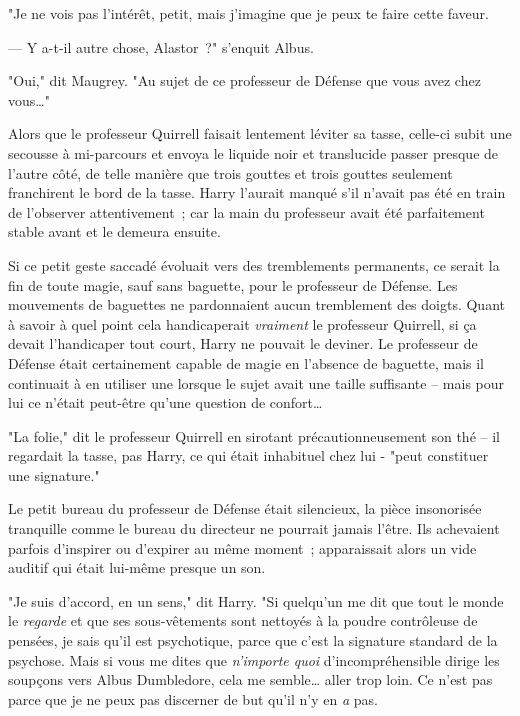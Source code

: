 "Je ne vois pas l'intérêt, petit, mais j'imagine que je peux te faire cette faveur.

--- Y a-t-il autre chose, Alastor~?" s'enquit Albus.

"Oui," dit Maugrey. "Au sujet de ce professeur de Défense que vous avez chez vous…"



Alors que le professeur Quirrell faisait lentement léviter sa tasse, celle-ci subit une secousse à mi-parcours et envoya le liquide noir et translucide passer presque de l'autre côté, de telle manière que trois gouttes et trois gouttes seulement franchirent le bord de la tasse. Harry l'aurait manqué s'il n'avait pas été en train de l'observer attentivement~; car la main du professeur avait été parfaitement stable avant et le demeura ensuite.

Si ce petit geste saccadé évoluait vers des tremblements permanents, ce serait la fin de toute magie, sauf sans baguette, pour le professeur de Défense. Les mouvements de baguettes ne pardonnaient aucun tremblement des doigts. Quant à savoir à quel point cela handicaperait \emph{vraiment} le professeur Quirrell, si ça devait l'handicaper tout court, Harry ne pouvait le deviner. Le professeur de Défense était certainement capable de magie en l'absence de baguette, mais il continuait à en utiliser une lorsque le sujet avait une taille suffisante -- mais pour lui ce n'était peut-être qu'une question de confort…

"La folie," dit le professeur Quirrell en sirotant précautionneusement son thé -- il regardait la tasse, pas Harry, ce qui était inhabituel chez lui - "peut constituer une signature."

Le petit bureau du professeur de Défense était silencieux, la pièce insonorisée tranquille comme le bureau du directeur ne pourrait jamais l'être. Ils achevaient parfois d'inspirer ou d'expirer au même moment~; apparaissait alors un vide auditif qui était lui-même presque un son.

"Je suis d'accord, en un sens," dit Harry. "Si quelqu'un me dit que tout le monde le \emph{regarde} et que ses sous-vêtements sont nettoyés à la poudre contrôleuse de pensées, je sais qu'il est psychotique, parce que c'est la signature standard de la psychose. Mais si vous me dites que \emph{n'importe quoi} d'incompréhensible dirige les soupçons vers Albus Dumbledore, cela me semble… aller trop loin. Ce n'est pas parce que je ne peux pas discerner de but qu'il n'y en \emph{a} pas.

